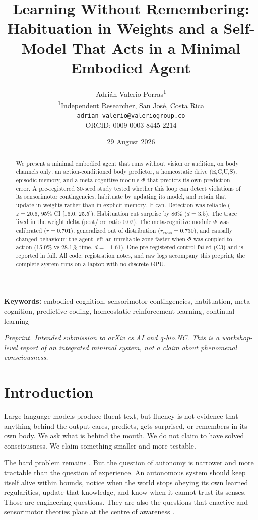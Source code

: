 \documentclass[11pt,a4paper]{article}
\title{Learning Without Remembering: Habituation in Weights and a Self-Model That Acts in a Minimal Embodied Agent}
\author{Adri\'an Valerio Porras\textsuperscript{1} \\ \small \textsuperscript{1}Independent Researcher, San Jos\'e, Costa Rica \\ \small \texttt{adrian\_valerio@valeriogroup.co} \\ \small ORCID: 0009-0003-8445-2214 }
\date{29 August 2026}
\begin{document}
\maketitle

\begin{abstract}
We present a minimal embodied agent that runs without vision or audition, on body channels only: an action-conditioned body predictor, a homeostatic drive (E,C,U,S), episodic memory, and a meta-cognitive module $\Phi$ that predicts its own prediction error. A pre-registered 30-seed study tested whether this loop can detect violations of its sensorimotor contingencies, habituate by updating its model, and retain that update in weights rather than in explicit memory. It can. Detection was reliable ($z=20.6$, 95\% CI [16.0, 25.5]). Habituation cut surprise by 86\% ($d=3.5$). The trace lived in the weight delta (post/pre ratio 0.02). The meta-cognitive module $\Phi$ was calibrated ($r=0.701$), generalized out of distribution ($r_{\mathrm{cross}}=0.730$), and causally changed behaviour: the agent left an unreliable zone faster when $\Phi$ was coupled to action (15.0\% vs 28.1\% time, $d=-1.61$). One pre-registered control failed (C3) and is reported in full. All code, registration notes, and raw logs accompany this preprint; the complete system runs on a laptop with no discrete GPU.
\end{abstract}

\noindent\textbf{Keywords:} embodied cognition, sensorimotor contingencies, habituation, meta-cognition, predictive coding, homeostatic reinforcement learning, continual learning

\noindent\textit{Preprint. Intended submission to arXiv cs.AI and q-bio.NC. This is a workshop-level report of an integrated minimal system, not a claim about phenomenal consciousness.}


\section{Introduction}

Large language models produce fluent text, but fluency is not evidence that anything behind the output cares, predicts, gets surprised, or remembers in its own body. We ask what is behind the mouth. We do not claim to have solved consciousness. We claim something smaller and more testable.

The hard problem remains \cite{chalmers1995}. But the question of autonomy is narrower and more tractable than the question of experience. An autonomous system should keep itself alive within bounds, notice when the world stops obeying its own learned regularities, update that knowledge, and know when it cannot trust its senses. Those are engineering questions. They are also the questions that enactive and sensorimotor theories place at the centre of awareness \cite{oregan2001, thompson2007}.
\end{document}
